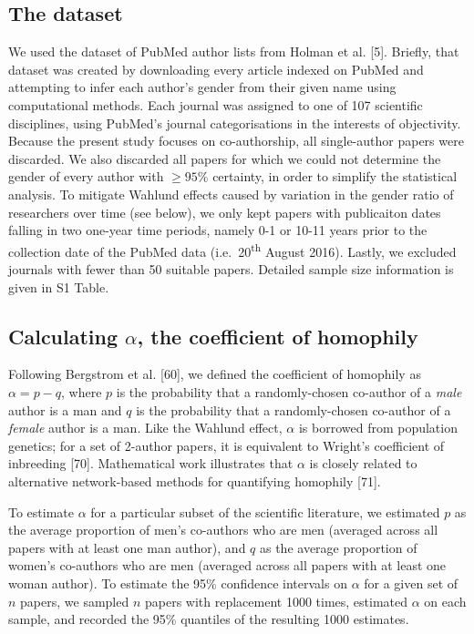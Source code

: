 \documentclass[12pt,]{article}
\begin{document}
\subsection{The dataset}\label{the-dataset}

We used the dataset of PubMed author lists from Holman et al. {[}5{]}.
Briefly, that dataset was created by downloading every article indexed
on PubMed and attempting to infer each author's gender from their given
name using computational methods. Each journal was assigned to one of
107 scientific disciplines, using PubMed's journal categorisations in
the interests of objectivity. Because the present study focuses on
co-authorship, all single-author papers were discarded. We also
discarded all papers for which we could not determine the gender of
every author with \({\ge}95\%\) certainty, in order to simplify the
statistical analysis. To mitigate Wahlund effects caused by variation in
the gender ratio of researchers over time (see below), we only kept
papers with publicaiton dates falling in two one-year time periods,
namely 0-1 or 10-11 years prior to the collection date of the PubMed
data (i.e.~20\textsuperscript{th} August 2016). Lastly, we excluded
journals with fewer than 50 suitable papers. Detailed sample size
information is given in S1 Table.

\subsection{\texorpdfstring{Calculating \(\alpha\), the coefficient of
homophily}{Calculating \textbackslash{}alpha, the coefficient of homophily}}\label{calculating-alpha-the-coefficient-of-homophily}

Following Bergstrom et al. {[}60{]}, we defined the coefficient of
homophily as \(\alpha = p - q\), where \(p\) is the probability that a
randomly-chosen co-author of a \emph{male} author is a man and \(q\) is
the probability that a randomly-chosen co-author of a \emph{female}
author is a man. Like the Wahlund effect, \(\alpha\) is borrowed from
population genetics; for a set of 2-author papers, it is equivalent to
Wright's coefficient of inbreeding {[}70{]}. Mathematical work
illustrates that \(\alpha\) is closely related to alternative
network-based methods for quantifying homophily {[}71{]}.

To estimate \(\alpha\) for a particular subset of the scientific
literature, we estimated \(p\) as the average proportion of men's
co-authors who are men (averaged across all papers with at least one man
author), and \(q\) as the average proportion of women's co-authors who
are men (averaged across all papers with at least one woman author). To
estimate the 95\% confidence intervals on \(\alpha\) for a given set of
\(n\) papers, we sampled \(n\) papers with replacement 1000 times,
estimated \(\alpha\) on each sample, and recorded the 95\% quantiles of
the resulting 1000 estimates.
\end{document}
